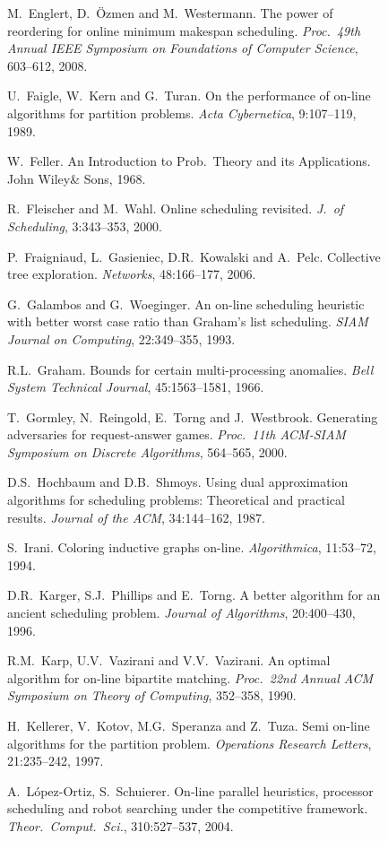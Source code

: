 \documentclass{llncs}
\begin{document}
\begin{figure}[h]
{\begin{minipage}{11.7cm}
\begin{thebibliography}{10}
M.\ Englert, D.\ \"Ozmen and M.\ Westermann. The power of reordering for online minimum makespan scheduling. 
{\em Proc.\ 49th Annual IEEE Symposium on Foundations of Computer Science\/}, 603--612, 2008.

U.\ Faigle, W.\ Kern and G.\ Turan. On the performance of on-line
algorithms for partition problems. {\em  Acta Cybernetica}, 9:107--119,
1989.

W.\ Feller. An Introduction to Prob.\ Theory and its Applications. John Wiley\& Sons, 1968.

R.~Fleischer and M.~Wahl. Online scheduling revisited. {\em J.\ of
Scheduling}, 3:343--353, 2000.

P.\ Fraigniaud, L.\ Gasieniec, D.R.\ Kowalski and A.\ Pelc. Collective tree exploration. 
{\em Networks\/}, 48:166--177, 2006.

G.\ Galambos and G.\ Woeginger. An on-line scheduling heuristic with 
better worst case ratio than Graham's list scheduling. {\em SIAM
Journal on Computing}, 22:349--355, 1993.

R.L.\ Graham. Bounds for certain multi-processing anomalies.
{\em Bell System Technical Journal}, 45:1563--1581, 1966.

T.~Gormley, N.~Reingold, E.~Torng and J.~Westbrook. Generating
adversaries for request-answer games. {\em Proc.\ 11th ACM-SIAM
Symposium on Discrete Algorithms\/}, 564--565, 2000.

D.S.\ Hochbaum and D.B.\ Shmoys. Using dual approximation algorithms for scheduling problems:
Theoretical and practical results. {\em Journal of the ACM\/}, 34:144--162, 1987.

S.\ Irani. Coloring inductive graphs on-line. {\em Algorithmica\/},  11:53--72, 1994.

D.R.~Karger, S.J.~Phillips and E.~Torng. A better algorithm for an
ancient scheduling problem. {\em Journal of Algorithms}, 20:400--430, 1996.

R.M.\ Karp, U.V.\ Vazirani and V.V.\ Vazirani. An optimal algorithm for on-line bipartite matching. 
{\em Proc.\ 22nd Annual ACM Symposium on Theory of Computing\/}, 352--358, 1990.

H.\ Kellerer, V.\ Kotov, M.G.\ Speranza and Z.\ Tuza. Semi on-line algorithms for the 
partition problem. {\em  Operations Research Letters\/}, 21:235--242, 1997.

A.\ L\'opez-Ortiz, S.\ Schuierer. On-line parallel heuristics, processor scheduling and robot searching 
under the competitive framework. {\em Theor.\ Comput.\ Sci.\/}, 310:527--537, 2004.


\end{thebibliography}
\end{minipage}}
\end{figure}
\end{document}

